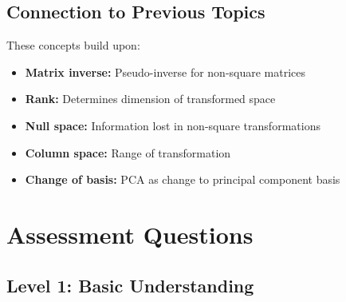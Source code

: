 \documentclass[12pt,a4paper]{article}
\theoremstyle{definition}
\begin{document}
\subsection{Connection to Previous Topics}

These concepts build upon:
\begin{itemize}
    \item \textbf{Matrix inverse:} Pseudo-inverse for non-square matrices
    \item \textbf{Rank:} Determines dimension of transformed space
    \item \textbf{Null space:} Information lost in non-square transformations
    \item \textbf{Column space:} Range of transformation
    \item \textbf{Change of basis:} PCA as change to principal component basis
\end{itemize}

\newpage

\section{Assessment Questions}

\subsection{Level 1: Basic Understanding}
\end{document}

